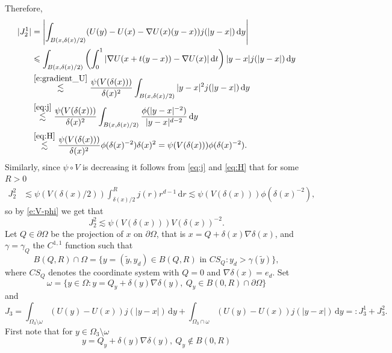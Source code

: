 \documentclass[a4paper,12pt,draft]{article}
\theoremstyle{plain}
\theoremstyle{definition}
\numberwithin{equation}{section}
\renewcommand{\le}{\leqslant}
\newcommand{\1}{1}
\newcommand{\dt} {\, \mathrm{d}t}
\newcommand{\dy} {\, \mathrm{d}y}
\newcommand{\dr} {\, \mathrm{d}r}
\begin{document}
Therefore,
\begin{align}
|J_2^1|&=\left|\int_{B(x,\delta(x)/2)} (U(y)-U(x)-\nabla U(x)(y-x))j(|y-x|)\dy\right|\nonumber\\
&\le\int_{B(x,\delta(x)/2)} \left(\int_0^1|\nabla U(x+t(y-x))-\nabla U(x)|\dt\right)|y-x| j(|y-x|)\dy\nonumber\\
&\overset{\eqref{e:gradient_U}}{\lesssim}\frac{\psi(V(\delta(x)))}{\delta(x)^2}\int_{B(x,\delta(x)/2)} |y-x|^2j(|y-x|)\dy\nonumber\\
&\overset{\eqref{eq:j}}{\lesssim} \frac{\psi(V(\delta(x)))}{\delta(x)^2}\int_{B(x,\delta(x)/2)} \frac{\phi(|y-x|^{-2})}{|y-x|^{d-2}}\dy\nonumber \\
&\overset{\eqref{eq:H}}{\lesssim} \frac{\psi(V(\delta(x)))}{\delta(x)^2}\phi(\delta(x)^{-2})\delta(x)^2=\psi(V(\delta(x)))\phi(\delta(x)^{-2}).\label{eq:J21}
\end{align}
Similarly, since $\psi\circ V$ is decreasing it follows from \eqref{eq:j} and \eqref{eq:H} that for some $R>0$
\begin{align*}
J_2^2&\lesssim\psi(V(\delta(x)/2))\int_{\delta(x)/2}^{R} j(r)r^{d-1}\dr\lesssim \psi(V(\delta(x)))\phi(\delta(x)^{-2}),
\end{align*}
so by \eqref{e:V-phi} we get that
\begin{equation}
J_2^2\lesssim \psi(V(\delta(x)))V(\delta(x))^{-2}.\label{eq:J22}
\end{equation}
Let $Q\in\partial\Omega$ be the projection of $x$ on $\partial\Omega$, that is $x=Q+\delta(x)\nabla\delta(x)$, and $\gamma=\gamma_Q$ the $C^{1,1}$ function such that
\begin{equation*}
B(Q,R) \cap\Omega = \{y = (\widetilde y,y_d) \in B(Q,R) \text{ in } CS_Q : y_d > \gamma(\widetilde y)\},
\end{equation*}
where $CS_Q$ denotes the coordinate system with $Q=0$ and $\nabla\delta(x)=e_d$. Set 
\begin{equation*}
\omega=\{y\in\Omega:y=Q_y+\delta(y)\nabla\delta(y),\ Q_y\in B(0,R) \cap\partial \Omega\}
\end{equation*}
and
\begin{equation*}
J_3=\int_{\Omega_3\setminus\omega } (U(y)-U(x))j(|y-x|)\dy+\int_{\Omega_3\cap \omega} (U(y)-U(x))j(|y-x|)\dy=:J_3^1+J_3^2.
\end{equation*}
First note that for $y\in\Omega_3\setminus \omega$
\begin{equation*}
y=Q_y+\delta(y)\nabla\delta(y),\ Q_y\not\in B(0,R)
\end{equation*}
\end{document}

